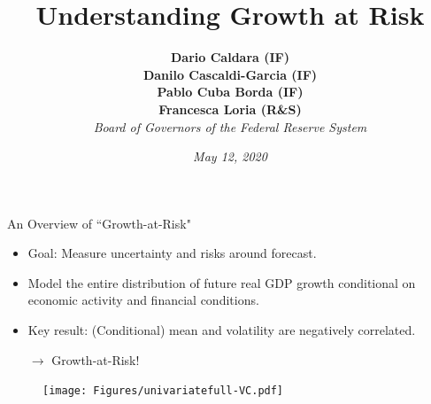 \documentclass[xcolor=dvipsnames, xcolor=table, 10pt]{beamer}
\newcommand{\bb}[1]{{\color{euiblue}#1}}
\newcommand{\rr}[1]{{\color{darkred}#1}}
\begin{document}
\playfair

\title[Understanding Growth at Risk]{\textbf{Understanding Growth at Risk}}
\thispagestyle{empty}
\author[Caldara, Cascaldi-Garcia, Cuba Borda, Loria]{\textbf{Dario Caldara (IF)\\ Danilo Cascaldi-Garcia (IF)\\ Pablo Cuba Borda (IF)\\ Francesca Loria (R\&S)}\\ \emph{Board of Governors of the Federal Reserve System}}

\date[Nonconfidential External]{\emph{May 12, 2020}}

\maketitle


\setcounter{framenumber}{0}
\begin{frame}{An Overview of ``Growth-at-Risk"}
\vspace*{0.12in}
\begin{itemize}
    \item {\bb{Goal:}} Measure uncertainty and risks around forecast.
    \bigskip    
    \item Model the \rr{entire} distribution of future real GDP growth \rr{conditional on economic activity and financial conditions}.
    \bigskip
    \item Key result: (Conditional) mean and volatility are negatively correlated.\\    
    \begin{center}
        $\longrightarrow$ \rr{Growth-at-Risk}! 
    \end{center}
    
\end{itemize}
\begin{figure}
    \texttt{[image: Figures/univariatefull-VC.pdf]}
\end{figure}

\end{frame}
\end{document}
